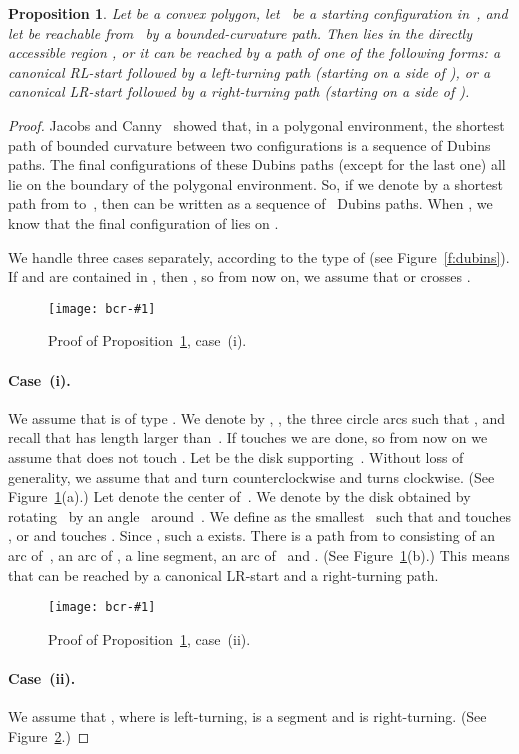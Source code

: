 \documentclass[a4paper]{article}
\newtheorem{prop}[theorem]{Proposition}
\newcommand{\epsfigure}[2]{
  \begin{figure}[htb]
    \centerline{\texttt{[image: bcr-\#1]}}
    \caption{#2}
    \label{f:#1}
  \end{figure}}
\begin{document}
\begin{prop}\label{p:rl-enough}
  Let  be a convex polygon, let~ be a starting configuration
  in~, and let  be reachable from~ by a
  bounded-curvature path.  Then  lies in the directly accessible
  region , or it can be reached by a path of one of the
  following forms: a canonical RL-start followed by a left-turning
  path (starting on a side of ), or a canonical LR-start followed
  by a right-turning path (starting on a side of ).
\end{prop}
\begin{proof}
  Jacobs and Canny~\cite{jc-pspmr-92} showed that, in a polygonal
  environment, the shortest path of bounded curvature between two
  configurations is a sequence of Dubins paths.  The final
  configurations of these Dubins paths (except for the last one) all
  lie on the boundary of the polygonal environment. So, if we denote
  by  a shortest path from  to~, then  can
  be written as a sequence 
  of ~Dubins paths. When , we know that the final
  configuration  of  lies on .

  We handle three cases separately, according to the type of
   (see Figure~\ref{f:dubins}). If  and
   are contained in , then , so from
  now on, we assume that  or  crosses
  .

\epsfigure{casei}{Proof of Proposition~\ref{p:rl-enough},
  case~(i).}
\paragraph{Case~(i).} We assume that  is of type .
  We denote by , ,  the three circle arcs such that
  , and recall that  has length larger
  than~.  If  touches  we are done, so from now on
  we assume that  does not touch .  Let  be the disk
  supporting~.  Without loss of generality, we assume that 
  and  turn counterclockwise and  turns clockwise.  (See
  Figure~\ref{f:casei}(a).)  Let  denote the center
  of~.  We denote by  the disk obtained by
  rotating~ by an angle~ around~. We define
   as the smallest~ such that  and  touches , or
     and  touches .  Since
    , such a
     exists.  There is a path from  to 
    consisting of an arc of~, an arc of ,
    a line segment, an arc of~ and . (See
    Figure~\ref{f:casei}(b).)  This means that  can be reached by a
    canonical LR-start and a right-turning path.

\epsfigure{caseii}{Proof of Proposition~\ref{p:rl-enough},
  case~(ii).}
\paragraph{Case~(ii).} We assume that ,
  where  is left-turning,  is a segment and 
   is right-turning. (See Figure~\ref{f:caseii}.)


\end{proof}
\end{document}
